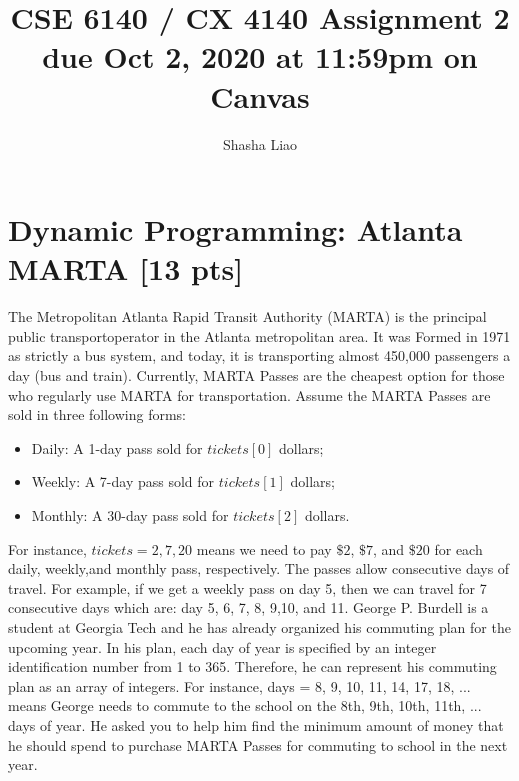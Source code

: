 \documentclass{article}
\title{CSE 6140 / CX 4140 Assignment 2\\due Oct 2, 2020 at 11:59pm on Canvas }
\author{Shasha Liao}
\date{}
\begin{document}
\maketitle

\noindent{}

\section{Dynamic Programming: Atlanta MARTA [13 pts]}
The  Metropolitan  Atlanta  Rapid Transit  Authority  (MARTA) is  the  principal  public  transportoperator in the Atlanta metropolitan area. It was Formed in 1971 as strictly a bus system, and today, it is transporting almost 450,000 passengers a day (bus and train). Currently, MARTA Passes are the cheapest option for those who regularly use MARTA for transportation. Assume the MARTA Passes are sold in three following forms:

\begin{itemize}
\item Daily: A 1-day pass sold for $tickets[0]$ dollars;
\item Weekly: A 7-day pass sold for $tickets[1]$ dollars;
\item Monthly: A 30-day pass sold for $tickets[2]$ dollars.
\end{itemize}

For instance, $tickets = {2, 7, 20}$ means we need to pay $\$2$, $\$7$, and $\$20$ for each daily, weekly,and monthly pass, respectively. The passes allow consecutive days of travel.  For example, if we get a weekly pass on day 5, then we can travel for 7 consecutive days which are: day 5, 6, 7, 8, 9,10, and 11. George P. Burdell is a student at Georgia Tech and he has already organized his commuting plan for  the  upcoming  year.  In  his  plan,  each   day of  year  is  specified   by an  integer   identification number from 1 to 365. Therefore, he can represent his commuting plan as an array of integers. For instance, days = {8, 9, 10, 11, 14, 17, 18, ...} means George needs to commute to the school on the 8th, 9th, 10th, 11th, ... days of year. He asked you to help him find the minimum amount of money that he should spend to purchase MARTA Passes for commuting to school in the next year. 
\end{document}
